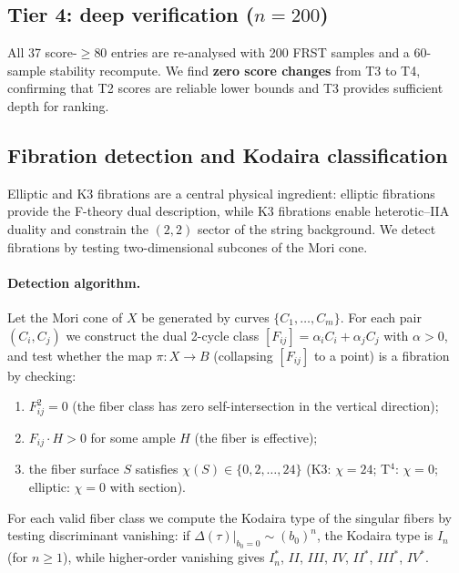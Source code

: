 \documentclass[11pt,a4paper]{article}
\begin{document}
\subsection{Tier 4: deep verification ($n=200$)}

All 37 score-$\geq 80$ entries are re-analysed with 200 FRST samples
and a 60-sample stability recompute.
We find \textbf{zero score changes} from T3 to T4, confirming that
T2 scores are reliable lower bounds and T3 provides sufficient
depth for ranking.

\subsection{Fibration detection and Kodaira classification}
\label{sec:fib_algo}

Elliptic and K3 fibrations are a central physical ingredient:
elliptic fibrations provide the F-theory dual description,
while K3 fibrations enable heterotic--IIA duality and
constrain the $(2,2)$ sector of the string background.
We detect fibrations by testing two-dimensional
subcones of the Mori cone.

\paragraph{Detection algorithm.}
Let the Mori cone of $X$ be generated by curves
$\{C_1,\ldots,C_m\}$.
For each pair $(C_i, C_j)$ we construct the dual 2-cycle class
$[F_{ij}] = \alpha_i C_i + \alpha_j C_j$ with $\alpha > 0$, and
test whether the map $\pi: X \to B$ (collapsing $[F_{ij}]$ to a
point) is a fibration by checking:
\begin{enumerate}[noitemsep]
  \item $F_{ij}^2 = 0$ (the fiber class has zero self-intersection
    in the vertical direction);
  \item $F_{ij} \cdot H > 0$ for some ample $H$
    (the fiber is effective);
  \item the fiber surface $S$ satisfies $\chi(S) \in \{0, 2, \ldots, 24\}$
    (K3: $\chi=24$; T$^4$: $\chi=0$; elliptic: $\chi=0$ with section).
\end{enumerate}
For each valid fiber class we compute the Kodaira type of the
singular fibers by testing discriminant vanishing:
if $\Delta(\tau)|_{b_0=0} \sim (b_0)^n$, the Kodaira type is $I_n$
(for $n \geq 1$), while higher-order vanishing gives
$I_n^*$, $II$, $III$, $IV$, $II^*$, $III^*$, $IV^*$.
\end{document}
